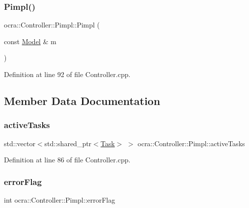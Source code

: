 \subsubsection{\texorpdfstring{Pimpl()}{Pimpl()}}
{\footnotesize\ttfamily ocra\+::\+Controller\+::\+Pimpl\+::\+Pimpl (\begin{DoxyParamCaption}\item[{const \hyperlink{classocra_1_1Model}{Model} \&}]{m }\end{DoxyParamCaption})\hspace{0.3cm}{\ttfamily [inline]}}



Definition at line 92 of file Controller.\+cpp.



\subsection{Member Data Documentation}
\hypertarget{structocra_1_1Controller_1_1Pimpl_a721a40c7b21e230a7508995ecfa93d60}{}\label{structocra_1_1Controller_1_1Pimpl_a721a40c7b21e230a7508995ecfa93d60} 
\subsubsection{\texorpdfstring{active\+Tasks}{activeTasks}}
{\footnotesize\ttfamily std\+::vector$<$std\+::shared\+\_\+ptr$<$\hyperlink{classocra_1_1Task}{Task}$>$ $>$ ocra\+::\+Controller\+::\+Pimpl\+::active\+Tasks}



Definition at line 86 of file Controller.\+cpp.

\hypertarget{structocra_1_1Controller_1_1Pimpl_a8a4ac972687499a277fa08dced73180c}{}\label{structocra_1_1Controller_1_1Pimpl_a8a4ac972687499a277fa08dced73180c} 
\subsubsection{\texorpdfstring{error\+Flag}{errorFlag}}
{\footnotesize\ttfamily int ocra\+::\+Controller\+::\+Pimpl\+::error\+Flag}



